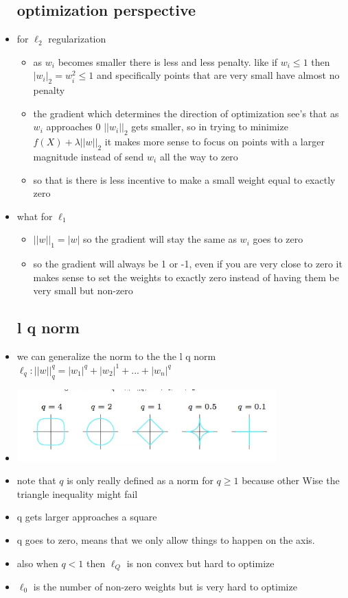 \documentclass{article}
\begin{document}
\begin{itemize}
\subsection{optimization perspective}
\item for $\ell_{2}$ regularization 
\begin{itemize}
    \item as $w_i$ becomes smaller there is less and less penalty. like if $w_i\leq 1$ then $|w_i|_2=w_i^2\leq 1$ and specifically points that are very small have almost no penalty
    \item the gradient which determines the direction of optimization see's that as $w_i$ approaches 0 $||w_i||_{2}$ gets smaller, so in trying to minimize $f(X)+\lambda||w||_{2}$ it makes more sense to focus on points with a larger magnitude instead of send $w_i$ all the way to zero
    \item so that is there is less incentive to make a small weight equal to exactly zero
\end{itemize}
\item what for $\ell_{1}$
\begin{itemize}
    \item $||w||_{1}=|w|$ so the gradient will stay the same as $w_i$ goes to zero 
    \item so the gradient will always be 1 or -1, even if you are very close to zero it makes sense to set the weights to exactly zero instead of having them be very small but non-zero
\end{itemize}
\subsection{ l q norm}
\item we can generalize the norm to the  the l q norm $\ell_{q}:||w||_{q}^{q}=|w_1|^{q}+|w_2|^{1}+...+|w_n|^{q}$
\item \includegraphics[width=10cm]{lecture_notes/lecture_3/immages/l3_10.jpg}
\item note that $q$ is only really defined as a norm for $q\geq 1$ because other Wise the triangle inequality might fail
\item q gets larger approaches a square
\item q goes to zero, means that we only allow things to happen on the axis. 
\item also when $q<1$ then $\ell_{Q}$ is non convex but hard to optimize
\item $\ell_{0}$ is the number of non-zero weights but is very hard to optimize

\end{itemize}
\end{document}
